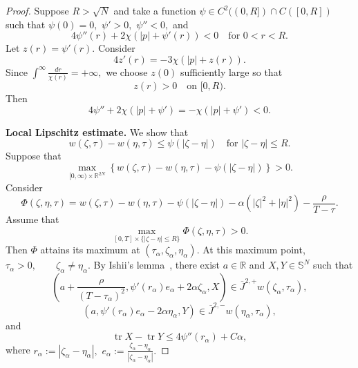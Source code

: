 \documentclass[preprint]{elsarticle}
\numberwithin{equation}{section}
\begin{document}
\begin{proof}
Suppose $R>\sqrt N$ and take a function
$
\psi\in C^2((0,R])\cap C([0,R])
$
such that
$
\psi(0)=0,$ $ \psi'>0,$ $ \psi''<0,
$
and
\begin{equation*}
4\psi''(r)+2\chi(|p|+\psi'(r))<0
\quad\text{for }0<r<R.
\end{equation*}
Let
$
z(r)=\psi'(r).
$
Consider
\begin{equation*}
4z'(r)=-3\chi(|p|+z(r)).
\end{equation*}
Since
$
\int^\infty \frac{dr}{\chi(r)}=+\infty,
$
we choose $z(0)$ sufficiently large so that
$$
z(r)>0\quad\text{on }[0,R).
$$
Then
\begin{equation*}
4\psi''+2\chi(|p|+\psi')
=
-\chi(|p|+\psi')<0.
\end{equation*}

\medskip

\noindent\textbf{Local Lipschitz estimate.}
We show that
\begin{equation*}
w(\zeta,\tau)-w(\eta,\tau)\le \psi(|\zeta-\eta|)
\quad\text{for }|\zeta-\eta|\le R.
\end{equation*}
Suppose that
\begin{equation*}
\max_{[0,\infty)\times\mathbb R^{2N}}
\left\{
w(\zeta,\tau)-w(\eta,\tau)-\psi(|\zeta-\eta|)
\right\}>0.
\end{equation*}
Consider
\begin{equation*}
\Phi(\zeta,\eta,\tau)
=
w(\zeta,\tau)-w(\eta,\tau)-\psi(|\zeta-\eta|)
-\alpha(|\zeta|^2+|\eta|^2)
-\frac{\rho}{T-\tau}.
\end{equation*}
Assume that
\begin{equation*}
\max_{[0,T]\times\{|\zeta-\eta|\le R\}}\Phi(\zeta,\eta,\tau)>0.
\end{equation*}
Then $\Phi$ attains its maximum at
$
(\tau_\alpha,\zeta_\alpha,\eta_\alpha).
$
At this maximum point,
$
\tau_\alpha>0,\qquad \zeta_\alpha\ne\eta_\alpha.
$
By Ishii's lemma~\cite{CrandallIshiiLions1992}, there exist $a\in\mathbb R$ and $X,Y\in\mathbb S^N$ such that
\begin{equation*}
\left(
a+\frac{\rho}{(T-\tau_\alpha)^2},
\psi'(r_\alpha)e_\alpha+2\alpha\zeta_\alpha,
X
\right)
\in
\overline J^{2,+}w(\zeta_\alpha,\tau_\alpha),
\end{equation*}
\begin{equation*}
\left(
a,
\psi'(r_\alpha)e_\alpha-2\alpha\eta_\alpha,
Y
\right)
\in
\overline J^{2,-}w(\eta_\alpha,\tau_\alpha),
\end{equation*}
and
\begin{equation*}
\operatorname{tr}X-\operatorname{tr}Y
\le
4\psi''(r_\alpha)+C\alpha,
\end{equation*}
where
$
r_\alpha:=|\zeta_\alpha-\eta_\alpha|,
$ $
e_\alpha:=\frac{\zeta_\alpha-\eta_\alpha}{|\zeta_\alpha-\eta_\alpha|}.
$


\end{proof}
\end{document}
